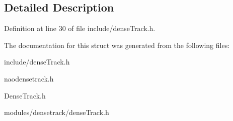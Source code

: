 \subsection{Detailed Description}


Definition at line 30 of file include/denseTrack.h.



The documentation for this struct was generated from the following files:\begin{DoxyCompactItemize}
\item 
include/denseTrack.h\item 
naodensetrack.h\item 
DenseTrack.h\item 
modules/densetrack/denseTrack.h\end{DoxyCompactItemize}
